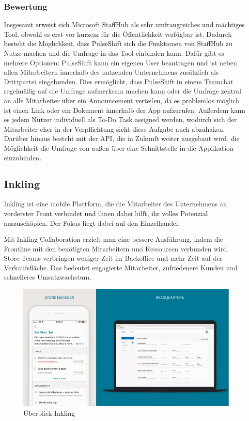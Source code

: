 \subsubsection{Bewertung}
Insgesamt erweist sich Microsoft StaffHub als sehr umfrangreiches und mächtiges Tool, obwohl es erst vor kurzem für die Öffentlichkeit verfügbar ist. Dadurch besteht die Möglichkeit, dass PulseShift sich die Funktionen von StaffHub zu Nutze machen und die Umfrage in das Tool einbinden kann. Dafür gibt es mehrere Optionen: PulseShift kann ein eigenen User beantragen und ist neben allen Mitarbeitern innerhalb des nutzenden Unternehmens zusätzlich als Drittpartei eingebunden. Dies ermöglicht, dass PulseShift in einem Teamchat regelmäßig auf die Umfrage aufmerksam machen kann oder die Umfrage zentral an alle Mitarbeiter über ein Announcement verteilen, da es problemlos möglich ist einen Link oder ein Dokument innerhalb der App aufzurufen. Außerdem kann es jedem Nutzer individuell als To-Do Task assigned werden, wodurch sich der Mitarbeiter eher in der Verpflichtung sieht diese Aufgabe auch abzuhaken.
Darüber hinaus besteht mit der API, die in Zukunft weiter ausgebaut wird, die Möglichkeit die Umfrage von außen über eine Schnittstelle in die Applikation einzubinden.

\subsection{Inkling}
Inkling ist eine mobile Plattform, die die Mitarbeiter des Unternehmens an vorderster Front verbindet und ihnen dabei hilft, ihr volles Potenzial auszuschöpfen. Der Fokus liegt dabei auf den Einzelhandel.

Mit Inkling Collaboration erzielt man eine bessere Ausführung, indem die Frontline mit den benötigten Mitarbeitern und Ressourcen verbunden wird. Store-Teams verbringen weniger Zeit im Backoffice und mehr Zeit auf der Verkaufsfläche. Das bedeutet engagierte Mitarbeiter, zufriedenere Kunden und schnelleres Umsatzwachstum. 

\begin{figure}[H] 
\centering 
\includegraphics[scale=0.72]{images/inkgeneral} 
\caption[Überblick Inkling]{Überblick Inkling\protect} 
\label{ws} 
\end{figure}

